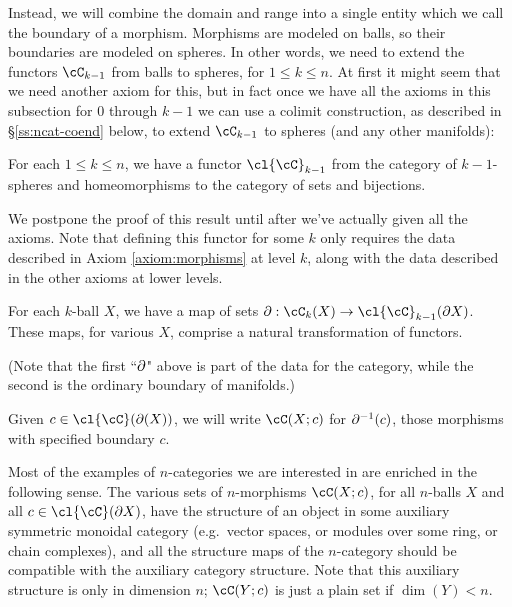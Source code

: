 Instead, we will combine the domain and range into a single entity which we call the 
boundary of a morphism.
Morphisms are modeled on balls, so their boundaries are modeled on spheres.
In other words, we need to extend the functors $\cC_{k-1}$ from balls to spheres, for 
$1\le k \le n$.
At first it might seem that we need another axiom for this, but in fact once we have
all the axioms in this subsection for $0$ through $k-1$ we can use a colimit
construction, as described in \S\ref{ss:ncat-coend} below, to extend $\cC_{k-1}$
to spheres (and any other manifolds):

\begin{lem}
\label{lem:spheres}
For each $1 \le k \le n$, we have a functor $\cl{\cC}_{k-1}$ from 
the category of $k{-}1$-spheres and 
homeomorphisms to the category of sets and bijections.
\end{lem}

We postpone the proof of this result until after we've actually given all the axioms.
Note that defining this functor for some $k$ only requires the data described in Axiom \ref{axiom:morphisms} at level $k$, 
along with the data described in the other axioms at lower levels. 


\begin{axiom}[Boundaries]\label{nca-boundary}
For each $k$-ball $X$, we have a map of sets $\bd: \cC_k(X)\to \cl{\cC}_{k-1}(\bd X)$.
These maps, for various $X$, comprise a natural transformation of functors.
\end{axiom}

(Note that the first ``$\partial$" above is part of the data for the category, 
while the second is the ordinary boundary of manifolds.)

Given $c\in\cl{\cC}(\bd(X))$, we will write $\cC(X; c)$ for $\partial^{-1}(c)$, those morphisms with specified boundary $c$.

Most of the examples of $n$-categories we are interested in are enriched in the following sense.
The various sets of $n$-morphisms $\cC(X; c)$, for all $n$-balls $X$ and
all $c\in \cl{\cC}(\bd X)$, have the structure of an object in some auxiliary symmetric monoidal category
(e.g.\ vector spaces, or modules over some ring, or chain complexes),
and all the structure maps of the $n$-category should be compatible with the auxiliary
category structure.
Note that this auxiliary structure is only in dimension $n$;
$\cC(Y; c)$ is just a plain set if $\dim(Y) < n$.

